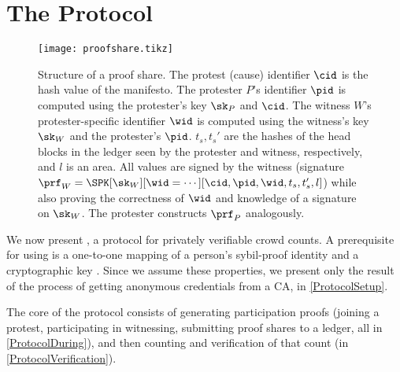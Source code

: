 \section{The \CROCUS Protocol}%
\label{Protocol}

\begin{figure}
  \centering
  \small
  \texttt{[image: proofshare.tikz]}
  \caption{%
    Structure of a proof share.
    The protest (cause) identifier \(\cid\) is the hash value of the manifesto.
    The protester \(P\)'s identifier \(\pid\) is computed using the protester's key \(\sk_P\) and \(\cid\).
    The witness \(W\)'s protester-specific identifier \(\wid\) is computed using the
    witness's key \(\sk_W\) and the protester's \(\pid\).
    \(t_s, t_s'\) are the hashes of the head blocks in the ledger seen by the 
    protester and witness, respectively, and \(l\) is an area.
    All values are signed by the witness (signature \(\prf_W = \SPK[\sk_W][\wid 
      = \dotsb][\cid, \pid, \wid, t_s, t_s', l]\)) while also proving the 
    correctness of \(\wid\) and knowledge of a signature on \(\sk_W\).
    The protester constructs \(\prf_P\) analogously.
  }%
  \label{fig:ProofFig}
\end{figure}%

We now present \CROCUS, a protocol for privately verifiable crowd
counts. A prerequisite for using \CROCUS is a one-to-one mapping of a person's
sybil-proof identity and a cryptographic key%
. Since we assume these properties, we
present only the result of the process of getting anonymous
credentials from a \ac{CA}, in \cref{ProtocolSetup}.

The core of the \CROCUS protocol consists of generating participation
proofs (joining a protest, participating in witnessing, submitting
proof shares to a ledger, all in \cref{ProtocolDuring}), and then counting and
verification of that count (in \cref{ProtocolVerification}). 

